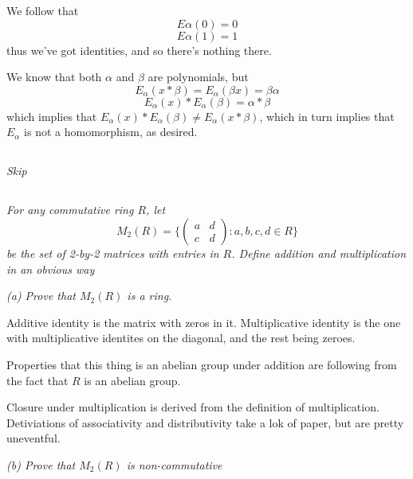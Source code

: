 \documentclass[11pt,oneside,titlepage]{book}
\newcommand{\set}[1]{\{ #1 \}}
\begin{document}
We follow that
$$E\alpha(0) = 0$$
$$E\alpha(1) = 1$$
thus we've got identities, and so there's nothing there.

We know that both $\alpha$ and $\beta$ are polynomials, but
$$E_\alpha(x * \beta) = E_\alpha(\beta x) = \beta \alpha$$
$$E_\alpha(x) * E_\alpha(\beta) = \alpha * \beta$$
which implies that $E_\alpha(x) * E_\alpha(\beta) \neq E_\alpha(x *
\beta)$, which in turn implies that $E_\alpha$ is not a homomorphism,
as desired.

\subsection{}

\textit{Skip}

\subsection{}

\textit{For any commutative ring $R$, let
  $$M_2(R) = \set{
    \begin{pmatrix}
      a & d \\ c & d
    \end{pmatrix}: a, b, c, d \in R
  }$$
  be the set of 2-by-2 matrices with entries in $R$. Define addition
  and multiplication in an obvious way }

\textit{(a) Prove that $M_2(R)$ is a ring.}

Additive identity is the matrix with zeros in it. Multiplicative
identity is the one with multiplicative identites on the diagonal, and
the rest being zeroes.

Properties that this thing is an abelian group
under addition are following from the fact that $R$ is an abelian
group.

Closure under multiplication is derived from the definition of
multiplication.  Detiviations of associativity and distributivity take
a lok of paper, but are pretty uneventful.

\textit{(b) Prove that $M_2(R)$ is non-commutative}
\end{document}
